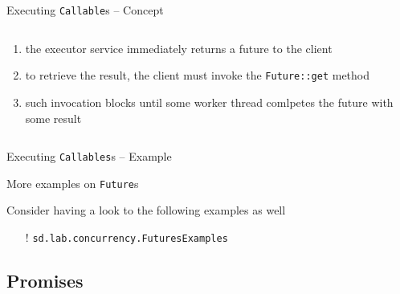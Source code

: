 \documentclass{beamer}\mode<presentation>{\usetheme{AMSBolognaFC}}
\begin{document}
\begin{frame}[c,allowframebreaks]{Executing \texttt{Callable}s -- Concept}
\begin{columns}
\begin{column}{.4\linewidth}
\begin{enumerate}
				\item the executor service \alert{immediately} returns a future to the client

				\item to retrieve the result, the client must invoke the \alert{\texttt{Future::get}} method

				\item such invocation \alert{blocks} until some worker thread \alert{comlpetes} the future with some result
			\end{enumerate}
		\end{column}
	\end{columns}

\end{frame}

\begin{frame}[c]{Executing \texttt{Callables}s -- Example}

	

\end{frame}

\begin{frame}[c]{More examples on \texttt{Future}s}

	Consider having a look to the following examples as well
	\begin{itemize}
		\item[!] \texttt{sd.lab.concurrency.\alert{FuturesExamples}}
	\end{itemize}

\end{frame}

\subsection{Promises}
\end{document}
